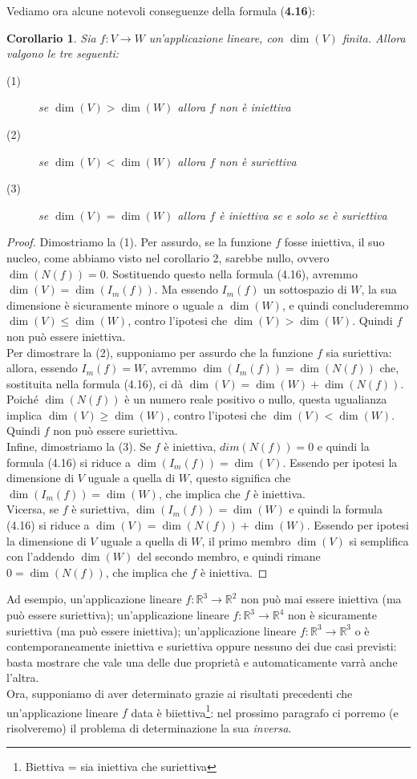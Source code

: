 \documentclass{book}
\newtheorem{corollario}{Corollario}
\begin{document}
Vediamo ora alcune notevoli conseguenze della formula (\textbf{4.16}):
\begin{corollario}
  Sia $f:V\to W$ un'applicazione lineare, con $\dim(V)$ finita.
  Allora valgono le tre seguenti:
  \begin{description}
  \item[(1)] se $\dim(V)>\dim(W)$ allora $f$ non è iniettiva
  \item[(2)] se $\dim(V)<\dim(W)$ allora $f$ non è suriettiva
  \item[(3)] se $\dim(V)=\dim(W)$ allora $f$ è iniettiva se e solo se è suriettiva
  \end{description}
\end{corollario}
\begin{proof}
  Dimostriamo la (1). Per assurdo, se la funzione $f$ fosse iniettiva, il suo nucleo, come abbiamo visto nel
  corollario 2, sarebbe nullo, ovvero $\dim(N(f))=0$. Sostituendo questo nella formula (4.16), avremmo
  $\dim(V)=\dim(I_m(f))$. Ma essendo $I_m(f)$ un sottospazio di $W$, la sua dimensione è sicuramente minore o
  uguale a $\dim(W)$, e quindi concluderemmo $\dim(V)\leq \dim(W)$, contro l'ipotesi che $\dim(V)>\dim(W)$. Quindi
  $f$ non può essere iniettiva.\\
  Per dimostrare la (2), supponiamo per assurdo che la funzione $f$ sia suriettiva: allora, essendo $I_m(f)=W$,
  avremmo $\dim(I_m(f))=\dim(N(f))$ che, sostituita nella formula (4.16), ci dà $\dim(V)=\dim(W)+\dim(N(f))$.
  Poiché $\dim(N(f))$ è un numero reale positivo o nullo, questa ugualianza implica $\dim(V)\geq\dim(W)$, contro
  l'ipotesi che $\dim(V)<\dim(W)$. Quindi $f$ non può essere suriettiva.\\
  Infine, dimostriamo la (3). Se $f$ è iniettiva, $dim(N(f))=0$ e quindi la formula (4.16) si riduce a
  $\dim(I_m(f))=\dim(V)$. Essendo per ipotesi la dimensione di $V$ uguale a quella di $W$, questo significa che
  $\dim(I_m(f))=\dim(W)$, che implica che $f$ è iniettiva.\\
  Vicersa, se $f$ è suriettiva, $\dim(I_m(f))=\dim(W)$ e quindi la formula (4.16) si riduce a
  $\dim(V)=\dim(N(f))+\dim(W)$. Essendo per ipotesi la dimensione di $V$ uguale a quella di $W$, il primo
  membro $\dim (V)$ si semplifica con l'addendo $\dim(W)$ del secondo membro, e quindi rimane $0=\dim(N(f))$,
  che implica che $f$ è iniettiva.
\end{proof}
Ad esempio, un'applicazione lineare $f:\mathbb{R}^3\to \mathbb{R}^2$ non può mai essere iniettiva (ma può essere
suriettiva); un'applicazione lineare $f:\mathbb{R}^3\to \mathbb{R}^4$ non è sicuramente suriettiva (ma può essere
iniettiva); un'applicazione lineare $f:\mathbb{R}^3\to \mathbb{R}^3$ o è contemporaneamente iniettiva e suriettiva
oppure nessuno dei due casi previsti: basta mostrare che vale una delle due proprietà e automaticamente varrà
anche l'altra.\\
Ora, supponiamo di aver determinato grazie ai risultati precedenti che un'applicazione lineare $f$ data è
biiettiva\footnote{Biettiva = sia iniettiva che suriettiva}: nel prossimo paragrafo ci porremo (e risolveremo) il
problema di determinazione la sua \textit{inversa}.
\end{document}
